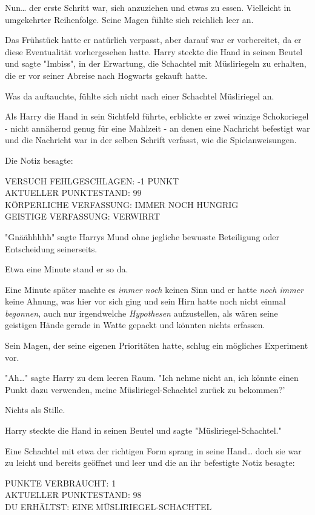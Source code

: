 {Nun… der erste Schritt war, sich anzuziehen und etwas zu essen. Vielleicht in umgekehrter Reihenfolge. Seine Magen fühlte sich reichlich leer an.

Das Frühstück hatte er natürlich verpasst, aber darauf war er vorbereitet, da er diese Eventualität vorhergesehen hatte. Harry steckte die Hand in seinen Beutel und sagte "Imbiss", in der Erwartung, die Schachtel mit Müsliriegeln zu erhalten, die er vor seiner Abreise nach Hogwarts gekauft hatte.

Was da auftauchte, fühlte sich nicht nach einer Schachtel Müsliriegel an.

Als Harry die Hand in sein Sichtfeld führte, erblickte er zwei winzige Schokoriegel - nicht annähernd genug für eine Mahlzeit - an denen eine Nachricht befestigt war und die Nachricht war in der selben Schrift verfasst, wie die Spielanweisungen.

Die Notiz besagte:

VERSUCH FEHLGESCHLAGEN: -1 PUNKT\\ AKTUELLER PUNKTESTAND: 99\\ KÖRPERLICHE VERFASSUNG: IMMER NOCH HUNGRIG\\ GEISTIGE VERFASSUNG: VERWIRRT

"Gnäähhhhh" sagte Harrys Mund ohne jegliche bewusste Beteiligung oder Entscheidung seinerseits.

Etwa eine Minute stand er so da.

Eine Minute später machte es \emph{immer noch} keinen Sinn und er hatte \emph{noch immer} keine Ahnung, was hier vor sich ging und sein Hirn hatte noch nicht einmal \emph{begonnen,} auch nur irgendwelche \emph{Hypothesen} aufzustellen, als wären seine geistigen Hände gerade in Watte gepackt und könnten nichts erfassen.

Sein Magen, der seine eigenen Prioritäten hatte, schlug ein mögliches Experiment vor.

"Ah…" sagte Harry zu dem leeren Raum. "Ich nehme nicht an, ich könnte einen Punkt dazu verwenden, meine Müsliriegel-Schachtel zurück zu bekommen?'

Nichts als Stille.

Harry steckte die Hand in seinen Beutel und sagte "Müsliriegel-Schachtel."

Eine Schachtel mit etwa der richtigen Form sprang in seine Hand… doch sie war zu leicht und bereits geöffnet und leer und die an ihr befestigte Notiz besagte:

PUNKTE VERBRAUCHT: 1\\ AKTUELLER PUNKTESTAND: 98\\ DU ERHÄLTST: EINE MÜSLIRIEGEL-SCHACHTEL

}
